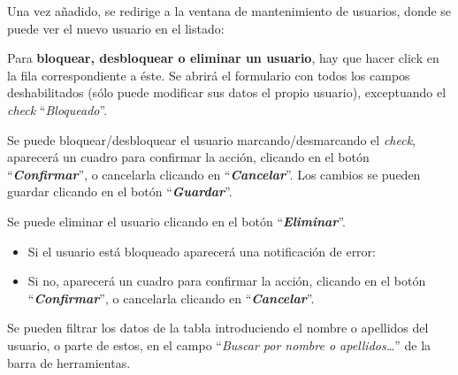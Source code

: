 
Una vez añadido, se redirige a la ventana de mantenimiento de usuarios, donde se puede ver el nuevo usuario en el listado:


Para \textbf{bloquear, desbloquear o eliminar un usuario}, hay que hacer click en la fila correspondiente a éste. Se abrirá el formulario con todos los campos deshabilitados (sólo puede modificar sus datos el propio usuario), exceptuando el \textit{check} ``\textit{Bloqueado}''.


Se puede bloquear/desbloquear el usuario marcando/desmarcando el \textit{check}, aparecerá un cuadro para confirmar la acción, clicando en el botón ``\textbf{\textit{Confirmar}}'', o cancelarla clicando en ``\textbf{\textit{Cancelar}}''. Los cambios se pueden guardar clicando en el botón ``\textbf{\textit{Guardar}}''.

    
Se puede eliminar el usuario clicando en el botón ``\textbf{\textit{Eliminar}}''.
    \begin{itemize}
        \item Si el usuario está bloqueado aparecerá una notificación de error:
        
        
        \item Si no, aparecerá un cuadro para confirmar la acción, clicando en el botón ``\textbf{\textit{Confirmar}}'', o cancelarla clicando en ``\textbf{\textit{Cancelar}}''.
        
    \end{itemize}
    
Se pueden filtrar los datos de la tabla introduciendo el nombre o apellidos del usuario, o parte de estos, en el campo ``\textit{Buscar por nombre o apellidos\dots}'' de la barra de herramientas.

